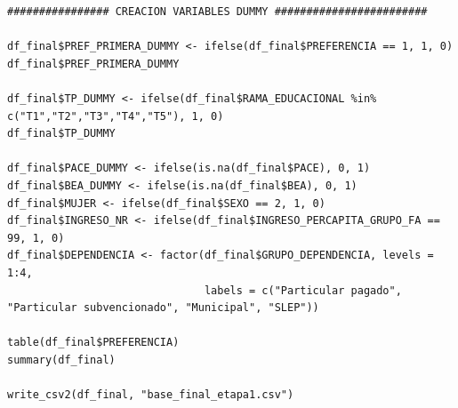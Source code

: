 \documentclass[11pt]{article}
\begin{document}
\begin{lstlisting}
################ CREACION VARIABLES DUMMY ########################

df_final$PREF_PRIMERA_DUMMY <- ifelse(df_final$PREFERENCIA == 1, 1, 0)
df_final$PREF_PRIMERA_DUMMY

df_final$TP_DUMMY <- ifelse(df_final$RAMA_EDUCACIONAL %in% c("T1","T2","T3","T4","T5"), 1, 0)
df_final$TP_DUMMY

df_final$PACE_DUMMY <- ifelse(is.na(df_final$PACE), 0, 1)
df_final$BEA_DUMMY <- ifelse(is.na(df_final$BEA), 0, 1)
df_final$MUJER <- ifelse(df_final$SEXO == 2, 1, 0)
df_final$INGRESO_NR <- ifelse(df_final$INGRESO_PERCAPITA_GRUPO_FA == 99, 1, 0)
df_final$DEPENDENCIA <- factor(df_final$GRUPO_DEPENDENCIA, levels = 1:4,
                               labels = c("Particular pagado", "Particular subvencionado", "Municipal", "SLEP"))

table(df_final$PREFERENCIA)
summary(df_final)

write_csv2(df_final, "base_final_etapa1.csv")
\end{lstlisting}
\end{document}
